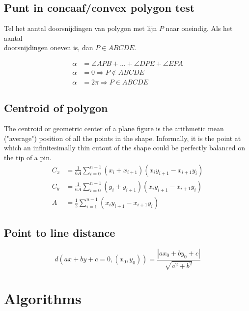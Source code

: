 \documentclass[a4paper, twocolumn]{article}
\newcommand{\point}[4]{\draw[fill] (#1,#2) circle (1pt) node[#4] {#3}}
\begin{document}
\subsection*{Punt in concaaf/convex polygon test}
Tel het aantal doorsnijdingen van polygon met lijn $P$ naar oneindig. Als het
aantal \\ doorsnijdingen oneven is, dan $P \in ABCDE$. \\
\begin{minipage}{.45\linewidth}
	\begin{align*}
	\alpha &= \angle APB + ... + \angle DPE + \angle EPA \\
	\alpha &= 0 \Rightarrow P \notin ABCDE \\
	\alpha &= 2\pi \Rightarrow P \in ABCDE
	\end{align*}
\end{minipage}\hfill%
\begin{minipage}{.5\linewidth}
	\centering
\end{minipage}

\vspace{-2.1em}
\subsection*{Centroid of polygon} \vspace{-0.3em}
The centroid or geometric center of a plane figure is the arithmetic mean
("average") position of all the points in the shape. Informally, it is the point
at which an infinitesimally thin cutout of the shape could be perfectly balanced
on the tip of a pin.
\vspace{-0.5em}
\begin{align*}
C_x &= \frac{1}{6A}\sum_{i=0}^{n-1}(x_i+x_{i+1})(x_iy_{i+1}-x_{i+1}y_i) \\
C_y &= \frac{1}{6A}\sum_{i=0}^{n-1}(y_i+y_{i+1})(x_iy_{i+1}-x_{i+1}y_i) \\
A   &= \frac{1}{2}\sum_{i=1}^{n-1}(x_iy_{i+1}-x_{i+1}y_i)
\end{align*}
\subsection*{Point to line distance}
\begin{equation*}
	d(ax+by+c=0, (x_0, y_0)) = \frac{|ax_0+by_0+c|}{\sqrt{a^2+b^2}}
\end{equation*}
\section{Algorithms}

\end{document}
